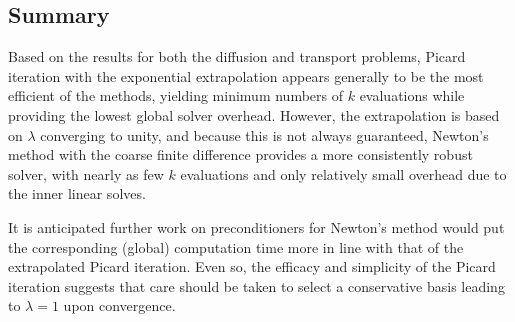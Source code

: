 \subsection{Summary}

Based on the results for both the diffusion and transport problems, Picard 
iteration with the exponential extrapolation appears generally to be the most
efficient of the methods, yielding minimum numbers of $k$ evaluations 
while providing the lowest global solver overhead.  However, the 
extrapolation is based on $\lambda$ converging to unity, and because this 
is not always guaranteed, Newton's method with the coarse finite difference 
provides a more consistently robust solver, with nearly as 
few $k$ evaluations and only relatively small overhead due to the 
inner linear solves.

It is anticipated further work on preconditioners for Newton's method 
would put the corresponding (global) computation time more in line with 
that of the extrapolated Picard iteration.  Even so, the efficacy and 
simplicity of the Picard iteration suggests that care should be taken to 
select a conservative basis leading to $\lambda = 1$ upon convergence.

